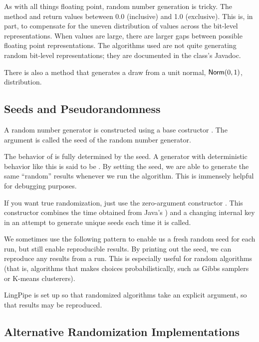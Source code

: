 As with all things floating point, random number generation is tricky.
The method  and  return values
beteween 0.0 (inclusive) and 1.0 (exclusive).  This is, in part, to
compensate for the uneven distribution of values across the bit-level
representations.  When values are large, there are larger gaps between
possible floating point representations.  The algorithms used are not
quite generating random bit-level representations; they are documented
in the class's Javadoc.

There is also a method  that generates a draw
from a unit normal, $\mbox{\sf Norm}(0,1)$, distribution.


\subsection{Seeds and Pseudorandomness}

A random number generator is constructed using a base costructor
.  The argument is called the seed of the random
number generator.

The behavior of  is fully determined by the seed.  A
generator with deterministic behavior like this is said to be
.  By setting the seed, we are able to
generate the same ``random'' results whenever we run the algorithm.
This is immensely helpful for debugging purposes.

If you want true randomization, just use the zero-argument constructor
.  This constructor combines the time obtained from
Java's ) and a changing internal key in an
attempt to generate unique seeds each time it is called.

We sometimes use the following pattern to enable us a fresh random
seed for each run, but still enable reproducible results.
%
%
By printing out the seed, we can reproduce any results from a run.
This is especially useful for random algorithms (that is, algorithms
that makes choices probabilistically, such as Gibbs samplers or
K-means clusterers).  

LingPipe is set up so that randomized algorithms take an explicit
 argument, so that results may be reproduced.


\subsection{Alternative Randomization Implementations}

